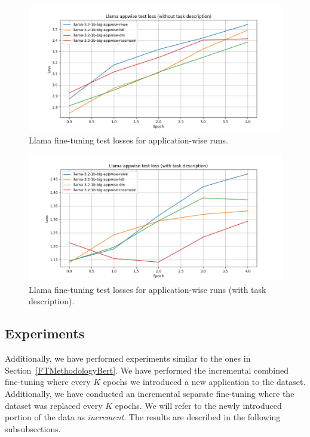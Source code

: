 \documentclass[licencjacka,en]{pracamgr}
\begin{document}
\begin{figure}[htbp]
    \centering
    \includegraphics[width=0.8\linewidth]{bachelor_images/llama_ft/llama-appwise-wth-test.png}
    \caption{Llama fine-tuning test losses for application-wise runs.}
    \label{fig:llama-wth-appwise}
\end{figure}

\begin{figure}[htbp]
    \centering
    \includegraphics[width=0.8\linewidth]{bachelor_images/llama_ft/llama-appwise-w-test.png}
    \caption{Llama fine-tuning test losses for application-wise runs (with task description).}
    \label{fig:llama-w-appwise}
\end{figure}

\FloatBarrier

\subsection{Experiments}

Additionally, we have performed experiments similar to the ones in Section~\ref{FTMethodologyBert}. We have performed the incremental combined fine-tuning where every $K$ epochs we introduced a new application to the dataset. Additionally, we have conducted an incremental separate fine-tuning where the dataset was replaced every $K$ epochs. We will refer to the newly introduced portion of the data as \emph{increment}. The results are described in the following subsubsections.
\end{document}
